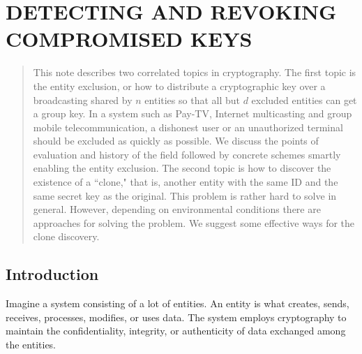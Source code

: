\documentclass{ims9x6}
\begin{document}
\chapter{DETECTING AND REVOKING COMPROMISED KEYS}


\author{Tsutomu Matsumoto}

\address{Graduate School of Environment and Information Sciences\\
Yokohama National University\\
79-7, Tokiwadai, Hodogaya, Yokohama, 240-8501, Japan\\
tsutomu@mlab.jks.ynu.ac.jp}

\begin{abstract}
This note describes two correlated topics in cryptography. The first
topic is the entity exclusion, or how to distribute a
cryptographic
key over a broadcasting shared by $n$ entities so that all but $d$
excluded entities can get a group key.
In a system such as Pay-TV, Internet multicasting and group
mobile telecommunication, a dishonest
user or an unauthorized terminal should be excluded as quickly as
possible. We discuss the points of evaluation and history of the field
followed by concrete schemes smartly enabling the entity
exclusion. The second topic is how to discover the existence of a
``clone," that is, another entity with the same ID and the same secret
key as the original. This problem is rather hard to solve in general.
However, depending on environmental
conditions there are approaches for solving the problem.
We suggest some effective ways for the clone discovery.
\end{abstract}

\vspace*{12pt}

\chaptercontents  %

\section{Introduction}
Imagine a system consisting of a lot of entities. An entity is what
creates, sends, receives, processes, modifies, or uses data.
The system employs \hbox{cryptography} to maintain the
confidentiality, integrity, or authenticity of data
exchanged among the entities.
\end{document}
